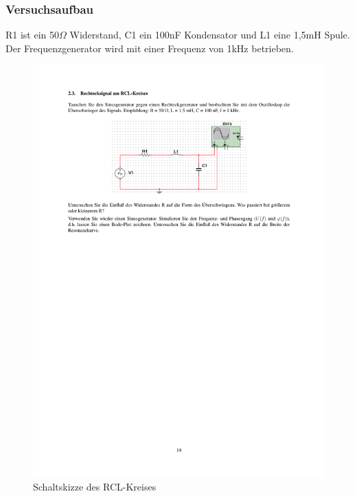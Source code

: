 \documentclass[12pt,a4paper]{article}
\begin{document}
\subsubsection{Versuchsaufbau}

R1 ist ein 50$\Omega$ Widerstand, C1 ein 100nF Kondensator und L1 eine 1,5mH Spule. Der Frequenzgenerator wird mit einer Frequenz von 1kHz betrieben.

\begin{figure}[H] 
  \centering
    \includegraphics[trim = 10mm 200mm 10mm 40mm, clip, scale = 1]{ep5_14[Page14].pdf}
  	\caption[Schaltskizze des RCL-Kreises]{Schaltskizze des RCL-Kreises\footnotemark}
  \label{fig:1_a_3}
\end{figure}
\end{document}
